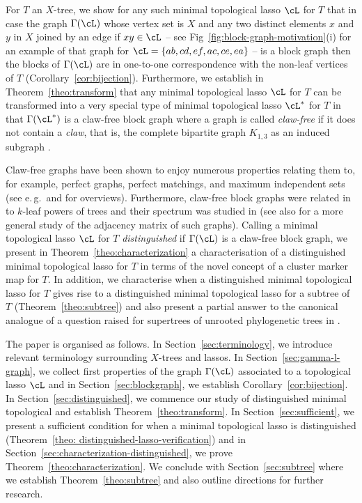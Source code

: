 For $T$ an $X$-tree, we show for any such minimal topological lasso $\cL$ for
$T$ that in case the graph $\Gamma(\cL)$ whose vertex set is $X$ and any two
distinct elements $x$ and $y$ in $X$ joined by an edge if $xy\in \cL$ -- see
Fig~\ref{fig:block-graph-motivation}(i) for an example of that graph for
$\cL=\{ab,cd,ef,ac,ce,ea\}$ -- is a block graph then the blocks of
$\Gamma(\cL)$ are in one-to-one correspondence with the non-leaf vertices of
$T$ (Corollary~\ref{cor:bijection}).  Furthermore, we establish in
Theorem~\ref{theo:transform} that any minimal topological lasso $\cL$ for $T$
can be transformed into a very special type of minimal topological lasso
$\cL^*$ for $T$ in that $\Gamma(\cL^*)$ is a claw-free block graph where a
graph is called {\em claw-free} if it does not contain a {\em claw}, that is,
the complete bipartite graph $K_{1,3}$ as an induced subgraph \cite{H72}.

Claw-free graphs have been shown to enjoy numerous properties relating them
to, for example, perfect graphs, perfect matchings, and maximum independent
sets (see e.\,g.\,\cite{FFZ97} and \cite{CFHV12} for overviews).  Furthermore,
claw-free block graphs were related in \cite{BL09} to $k$-leaf powers of trees
and their spectrum was studied in \cite{GS01, MSST06} (see also \cite{BR13}
for a more general study of the adjacency matrix of such graphs).  Calling a
minimal topological lasso $\cL$ for $T$ {\em distinguished} if $\Gamma(\cL)$
is a claw-free block graph, we present in Theorem~\ref{theo:characterization}
a characterisation of a distinguished minimal topological lasso for $T$ in
terms of the novel concept of a cluster marker map for $T$. In addition, we
characterise when a distinguished minimal topological lasso for $T$ gives rise
to a distinguished minimal topological lasso for a subtree of $T$
(Theorem~\ref{theo:subtree}) and also present a partial answer to the
canonical analogue of a question raised for supertrees of unrooted
phylogenetic trees in \cite{dress11lassoing}.

The paper is organised as follows. In Section~\ref{sec:terminology}, we
introduce relevant terminology surrounding $X$-trees and lassos. In
Section~\ref{sec:gamma-l-graph}, we collect first properties of the graph
$\Gamma(\cL)$ associated to a topological lasso $\cL$ and in
Section~\ref{sec:blockgraph}, we establish Corollary~\ref{cor:bijection}. In
Section~\ref{sec:distinguished}, we commence our study of distinguished
minimal topological and establish Theorem~\ref{theo:transform}. In
Section~\ref{sec:sufficient}, we present a sufficient condition for when a
minimal topological lasso is distinguished (Theorem~\ref{theo:
  distinguished-lasso-verification}) and in
Section~\ref{sec:characterization-distinguished}, we prove
Theorem~\ref{theo:characterization}. We conclude with
Section~\ref{sec:subtree} where we establish Theorem~\ref{theo:subtree} and
also outline directions for further research.


